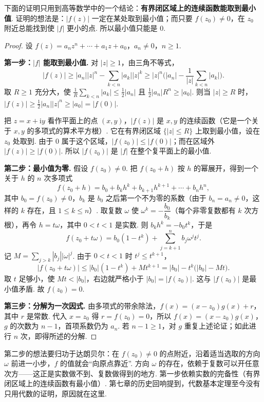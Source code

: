 下面的证明只用到高等数学中的一个结论：\textbf{有界闭区域上的连续函数能取到最小值}. 证明的想法是：$|f(z)|$ 一定在某处取到最小值；而只要 $f(z_0)\ne0$，在 $z_0$ 附近总能找到使 $|f|$ 更小的点. 所以最小值只能是 $0$.

\begin{proof}
	设 $f(z)=a_nz^n+\cdots+a_1z+a_0$，$a_n\ne0$，$n\ge1$.
	
	\textbf{第一步：$|f|$ 能取到最小值.} 对 $|z|\ge1$，由三角不等式，
	\[|f(z)|\ge|a_n||z|^n-\sum_{k<n}|a_k||z|^k\ge|z|^n\Big(|a_n|-\frac{1}{|z|}\sum_{k<n}|a_k|\Big).\]
	取 $R\ge1$ 充分大，使 $\frac1R\sum_{k<n}|a_k|\le\frac12|a_n|$ 且 $\frac12|a_n|R^n\ge|a_0|$. 则当 $|z|\ge R$ 时，$|f(z)|\ge\frac12|a_n||z|^n\ge|a_0|=|f(0)|$.
	
	把 $z=x+\mathrm iy$ 看作平面上的点 $(x,y)$，$|f(z)|$ 是 $x,y$ 的连续函数（它是一个关于 $x,y$ 的多项式的算术平方根）. 它在有界闭区域 $\{|z|\le R\}$ 上取到最小值，设在 $z_0$ 处取到. 由于 $0$ 属于这个区域，$|f(z_0)|\le|f(0)|$；而在区域外 $|f(z)|\ge|f(0)|$. 所以 $|f(z_0)|$ 是 $|f|$ 在整个复平面上的最小值.
	
	\textbf{第二步：最小值为零.} 假设 $f(z_0)\ne0$. 把 $f(z_0+h)$ 按 $h$ 的幂展开，得到一个关于 $h$ 的 $n$ 次多项式
	\[f(z_0+h)=b_0+b_kh^k+b_{k+1}h^{k+1}+\cdots+b_nh^n,\]
	其中 $b_0=f(z_0)\ne0$，$b_k$ 是 $b_0$ 之后第一个不为零的系数（由于 $b_n=a_n\ne0$，这样的 $k$ 存在，且 $1\le k\le n$）. 取复数 $\omega$ 使 $\omega^k=-\dfrac{b_0}{b_k}$（每个非零复数都有 $k$ 次方根），再令 $h=t\omega$，其中 $0<t<1$ 是实数. 则 $b_kh^k=-b_0t^k$，于是
	\[f(z_0+t\omega)=b_0(1-t^k)+\sum_{j=k+1}^nb_j\omega^jt^j.\]
	记 $M=\sum_{j>k}|b_j||\omega|^j$. 由于 $0<t<1$ 时 $t^j\le t^{k+1}$，
	\[|f(z_0+t\omega)|\le|b_0|(1-t^k)+Mt^{k+1}=|b_0|-t^k\big(|b_0|-Mt\big).\]
	取 $t$ 足够小，使 $Mt<|b_0|$，右边就严格小于 $|b_0|=|f(z_0)|$. 这与 $|f(z_0)|$ 是最小值矛盾. 故 $f(z_0)=0$.
	
	\textbf{第三步：分解为一次因式.} 由多项式的带余除法，$f(x)=(x-z_0)g(x)+r$，其中 $r$ 是常数. 代入 $x=z_0$ 得 $r=f(z_0)=0$，所以 $f(x)=(x-z_0)g(x)$，$g$ 的次数为 $n-1$，首项系数仍为 $a_n$. 若 $n-1\ge1$，对 $g$ 重复上述论证；如此进行 $n$ 次，即得所述的分解.
\end{proof}

第二步的想法要归功于达朗贝尔：在 $f(z_0)\ne0$ 的点附近，沿着适当选取的方向 $\omega$ 前进一小步，$f$ 的值就会“向原点靠近”. 方向 $\omega$ 的存在，依赖于复数可以开任意次方——这正是实数做不到、复数做得到的地方. 第一步依赖实数的完备性（有界闭区域上的连续函数有最小值）. 第七章的历史回响提到，代数基本定理至今没有只用代数的证明，原因就在这里.

